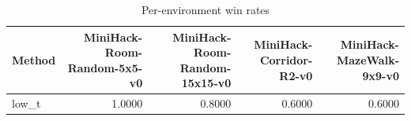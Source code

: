 \begin{table}[htbp]
\centering
\caption{Per-environment win rates}
\label{tab:per-env}
\begin{tabular}{lrrrr}
\toprule
\textbf{Method} & \textbf{MiniHack-Room-Random-5x5-v0} & \textbf{MiniHack-Room-Random-15x15-v0} & \textbf{MiniHack-Corridor-R2-v0} & \textbf{MiniHack-MazeWalk-9x9-v0} \\
\midrule
low\_t & 1.0000 & 0.8000 & 0.6000 & 0.6000 \\
\bottomrule
\end{tabular}
\end{table}
